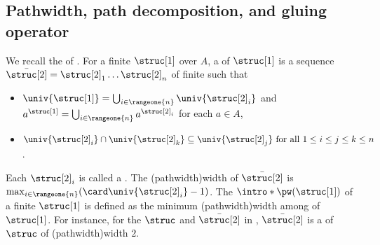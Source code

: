 \documentclass[a4paper,UKenglish,cleveref, autoref, thm-restate]{lipics-v2021}
\newcommand{\mul}[1]{\bar{#1}}
\begin{document}
%
%
%
%
%
%
%
%
%
%
%
%
%
%

\subsection{Pathwidth, path decomposition, and gluing operator}
\AP
We recall the  of  \cite[Def.\ 9.12]{courcelleGraphStructureMonadic2012}.
For a finite  $\struc[1]$ over $A$,
a \intro*{} of $\struc[1]$ is a sequence $\mul{\struc[2]} = \struc[2]_1 \dots \struc[2]_n$ of finite  such that
\begin{itemize}
    \item $\univ{\struc[1]} = \bigcup_{i \in \rangeone{n}} \univ{\struc[2]_{i}}$ and $a^{\struc[1]} = \bigcup_{i \in \rangeone{n}} a^{\struc[2]_{i}}$ for each $a \in A$,
    \item $\univ{\struc[2]_i} \cap \univ{\struc[2]_k} \subseteq \univ{\struc[2]_j} \mbox{ for all $1 \le i \le j \le k \le n$}$.
\end{itemize}
Each $\struc[2]_i$ is called a \intro*{}.
\AP
The \intro*\kl(pathwidth){width} of $\mul{\struc[2]}$ is $\max_{i \in \rangeone{n}}(\card \univ{\struc[2]_i} - 1)$.
The \intro*{} $\intro*\pw(\struc[1])$ of a finite  $\struc[1]$ is defined as the minimum \kl(pathwidth){width} among  of $\struc[1]$.
For instance, for the $\struc$ and $\mul{\struc[2]}$ in ,
$\mul{\struc[2]}$ is a  of $\struc$ of \kl(pathwidth){width} $2$.
\end{document}
